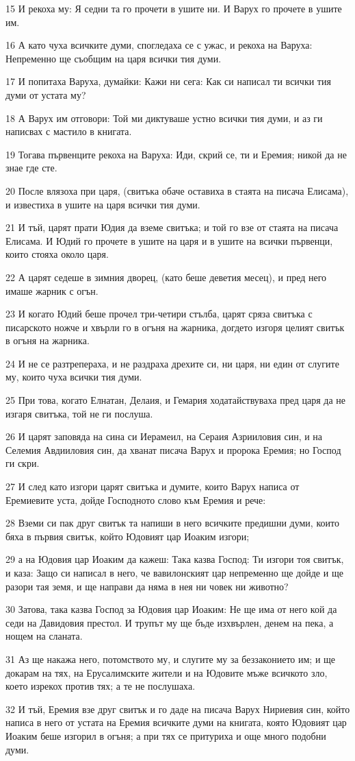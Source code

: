 \par 15 И рекоха му: Я седни та го прочети в ушите ни. И Варух го прочете в ушите им.
\par 16 А като чуха всичките думи, спогледаха се с ужас, и рекоха на Варуха: Непременно ще съобщим на царя всички тия думи.
\par 17 И попитаха Варуха, думайки: Кажи ни сега: Как си написал ти всички тия думи от устата му?
\par 18 А Варух им отговори: Той ми диктуваше устно всички тия думи, и аз ги написвах с мастило в книгата.
\par 19 Тогава първенците рекоха на Варуха: Иди, скрий се, ти и Еремия; никой да не знае где сте.
\par 20 После влязоха при царя, (свитъка обаче оставиха в стаята на писача Елисама), и известиха в ушите на царя всички тия думи.
\par 21 И тъй, царят прати Юдия да вземе свитъка; и той го взе от стаята на писача Елисама. И Юдий го прочете в ушите на царя и в ушите на всички първенци, които стояха около царя.
\par 22 А царят седеше в зимния дворец, (като беше деветия месец), и пред него имаше жарник с огън.
\par 23 И когато Юдий беше прочел три-четири стълба, царят сряза свитъка с писарското ножче и хвърли го в огъня на жарника, догдето изгоря целият свитък в огъня на жарника.
\par 24 И не се разтрепераха, и не раздраха дрехите си, ни царя, ни един от слугите му, които чуха всички тия думи.
\par 25 При това, когато Елнатан, Делаия, и Гемария ходатайствуваха пред царя да не изгаря свитъка, той не ги послуша.
\par 26 И царят заповяда на сина си Иерамеил, на Сераия Азрииловия син, и на Селемия Авдииловия син, да хванат писача Варух и пророка Еремия; но Господ ги скри.
\par 27 И след като изгори царят свитъка и думите, които Варух написа от Еремиевите уста, дойде Господното слово към Еремия и рече:
\par 28 Вземи си пак друг свитък та напиши в него всичките предишни думи, които бяха в първия свитък, който Юдовият цар Иоаким изгори;
\par 29 а на Юдовия цар Иоаким да кажеш: Така казва Господ: Ти изгори тоя свитък, и каза: Защо си написал в него, че вавилонският цар непременно ще дойде и ще разори тая земя, и ще направи да няма в нея ни човек ни животно?
\par 30 Затова, така казва Господ за Юдовия цар Иоаким: Не ще има от него кой да седи на Давидовия престол. И трупът му ще бъде изхвърлен, денем на пека, а нощем на сланата.
\par 31 Аз ще накажа него, потомството му, и слугите му за беззаконието им; и ще докарам на тях, на Ерусалимските жители и на Юдовите мъже всичкото зло, което изрекох против тях; а те не послушаха.
\par 32 И тъй, Еремия взе друг свитък и го даде на писача Варух Нириевия син, който написа в него от устата на Еремия всичките думи на книгата, която Юдовият цар Иоаким беше изгорил в огъня; а при тях се притуриха и още много подобни думи.

